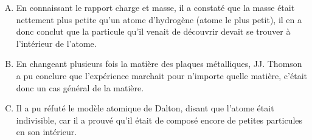 \documentclass[../main.tex]{subfiles}
\begin{document}
\begin{enumerate}[I]
\begin{enumerate}[A. ]
        \item En connaissant le rapport charge et masse, il a constaté que la masse était nettement plus petite qu'un atome d'hydrogène (atome le plus petit), il en a donc conclut que la particule qu'il venait de découvrir devait se trouver à l'intérieur de l'atome.
        \item En changeant plusieurs fois la matière des plaques métalliques, JJ. Thomson a pu conclure que l'expérience marchait pour n'importe quelle matière, c'était donc un cas général de la matière.
        \item Il a pu réfuté le modèle atomique de Dalton, disant que l'atome était indivisible, car il a prouvé qu'il était de composé encore de petites particules en son intérieur.
    \end{enumerate}
\end{enumerate}



\end{document}

